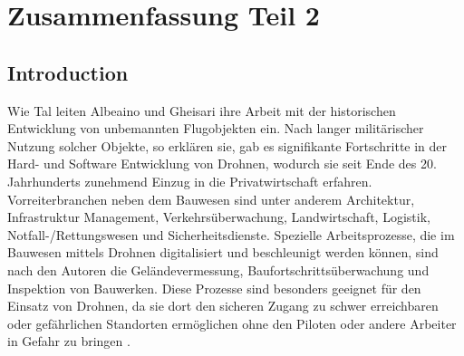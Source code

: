 \chapter{Zusammenfassung Teil 2}\label{ch:summary2}

\section{Introduction}

Wie Tal leiten Albeaino und Gheisari ihre Arbeit mit der historischen Entwicklung von unbemannten Flugobjekten ein.
Nach langer militärischer Nutzung solcher Objekte, so erklären sie, gab es signifikante Fortschritte in der Hard- und Software Entwicklung von Drohnen, wodurch sie seit Ende des 20. Jahrhunderts zunehmend Einzug in die Privatwirtschaft erfahren.
Vorreiterbranchen neben dem Bauwesen sind unter anderem Architektur, Infrastruktur Management, Verkehrsüberwachung, Landwirtschaft, Logistik, Notfall-/Rettungswesen und Sicherheitsdienste.
Spezielle Arbeitsprozesse, die im Bauwesen mittels Drohnen digitalisiert und beschleunigt werden können, sind nach den Autoren die Geländevermessung, Baufortschrittsüberwachung und Inspektion von Bauwerken.
Diese Prozesse sind besonders geeignet für den Einsatz von Drohnen, da sie dort den sicheren Zugang zu schwer erreichbaren oder gefährlichen Standorten ermöglichen ohne den Piloten oder andere Arbeiter in Gefahr zu bringen \cite[S. 84--85]{abaeano2021trends}.



